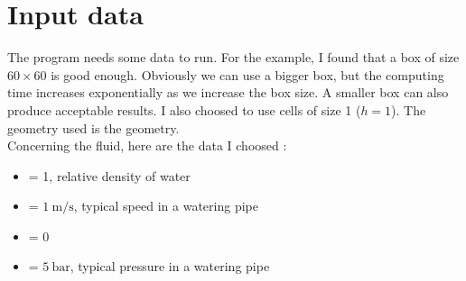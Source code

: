 \section{Input data}
The program needs some data to run. For the example, I found that a box of size
$\num{60} \times \num{60}$ is good enough. Obviously we can use a bigger box,
but the computing time increases exponentially as we increase the box size.
A smaller box can also produce acceptable results. I also choosed to use cells
of size 1 ($h = 1$). The geometry used is the  geometry.\\
Concerning the fluid, here are the data I choosed :
\begin{itemize}
      \item {} = 1, relative density of water
      \item {} = $\SI{1}{\meter\per\second}$, typical speed in a watering
            pipe
      \item {} = 0
      \item {} = $\SI{5}{\bar}$, typical pressure in a watering
            pipe
\end{itemize}

